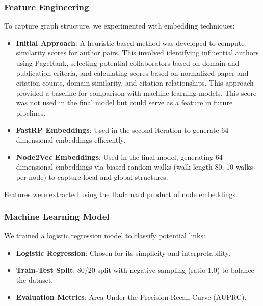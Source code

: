 \documentclass[conference, 12pt]{IEEEtran}
\begin{document}
\subsubsection{Feature Engineering}
To capture graph structure, we experimented with embedding techniques:
\begin{itemize}
  \item \textbf{Initial Approach}: A heuristic-based method was developed to compute similarity scores for author pairs. This involved identifying influential authors using PageRank, selecting potential collaborators based on domain and publication criteria, and calculating scores based on normalized paper and citation counts, domain similarity, and citation relationships. This approach provided a baseline for comparison with machine learning models. This score was not used in the final model but could serve as a feature in future pipelines.
  \item \textbf{FastRP Embeddings}: Used in the second iteration to generate 64-dimensional embeddings efficiently.
  \item \textbf{Node2Vec Embeddings}: Used in the final model, generating 64-dimensional embeddings via biased random walks (walk length 80, 10 walks per node) to capture local and global structures.
\end{itemize}
Features were extracted using the Hadamard product of node embeddings.

\subsubsection{Machine Learning Model}
We trained a logistic regression model to classify potential links:
\begin{itemize}
  \item \textbf{Logistic Regression}: Chosen for its simplicity and interpretability.
  \item \textbf{Train-Test Split}: 80/20 split with negative sampling (ratio 1.0) to balance the dataset.
  \item \textbf{Evaluation Metrics}: Area Under the Precision-Recall Curve (AUPRC).
\end{itemize}
\end{document}
